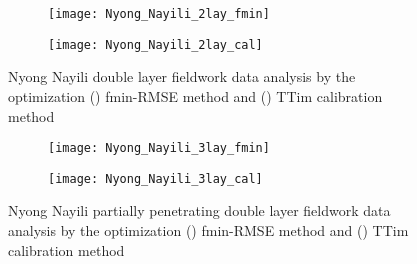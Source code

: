 \begin{figure}[h!]
	\centering
	\begin{subfigure}[b]{0.65\linewidth}
		\centering\texttt{[image: Nyong\_Nayili\_2lay\_fmin]}
		\captionsetup{justification=centering}		
		\caption{\label{fig:Nyong_Nayili_2lay_fmin}}
		\end{subfigure}\vfill
	\begin{subfigure}[b]{0.65\linewidth}
		\centering\texttt{[image: Nyong\_Nayili\_2lay\_cal]}
		\captionsetup{justification=centering}		
		\caption{\label{fig:Nyong_Nayili_2lay_cal}}
		\end{subfigure}
	\captionsetup{justification=centering}	
	\caption{Nyong Nayili double layer fieldwork data analysis by the optimization () fmin-RMSE method and () TTim calibration method} 
	\label{fig:Nyong_Nayili_2lay_analysis}
\end{figure} 

\begin{figure}[h!]
	\centering
	\begin{subfigure}[b]{0.65\linewidth}
		\centering\texttt{[image: Nyong\_Nayili\_3lay\_fmin]}
		\captionsetup{justification=centering}		
		\caption{\label{fig:Nyong_Nayili_3lay_fmin}}
		\end{subfigure}\vfill
	\begin{subfigure}[b]{0.65\linewidth}
		\centering\texttt{[image: Nyong\_Nayili\_3lay\_cal]}
		\captionsetup{justification=centering}		
		\caption{\label{fig:Nyong_Nayili_3lay_cal}}
		\end{subfigure}
	\captionsetup{justification=centering}	
	\caption{Nyong Nayili partially penetrating double layer fieldwork data analysis by the optimization () fmin-RMSE method and () TTim calibration method} 
	\label{fig:Nyong_Nayili_3lay_analysis}
\end{figure} 

\clearpage

